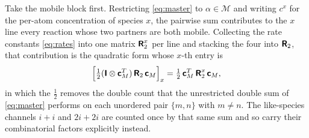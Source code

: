 Take the mobile block first. Restricting \cref{eq:master} to $\alpha\in\mathcal
M$ and writing $c^{x}$ for the per-atom concentration of species $x$, the
pairwise sum contributes to the $x$ line every reaction whose two partners are
both mobile. Collecting the rate constants \cref{eq:rates} into one matrix
$\bm{\mathsf{R}}_2^{x}$ per line and stacking the four into $\bm{\mathsf{R}}_2$, that
contribution is the quadratic form whose $x$-th entry is
\begin{equation}
  \Bigl[\tfrac12(\bm{\mathsf{I}}\otimes\bm{\mathsf{c}}_M^{T})\,\bm{\mathsf{R}}_2\,\bm{\mathsf{c}}_M\Bigr]_{x}
  =\tfrac12\,\bm{\mathsf{c}}_M^{T}\,\bm{\mathsf{R}}_2^{x}\,\bm{\mathsf{c}}_M ,
  \label{eq:d-quadratic}
\end{equation}
in which the $\tfrac12$ removes the double count that the unrestricted double
sum of \cref{eq:master} performs on each unordered pair $\{m,n\}$ with $m\ne n$.
The like-species channels $i\!+\!i$ and $2i\!+\!2i$ are counted once by that
same sum and so carry their combinatorial factors explicitly instead.

